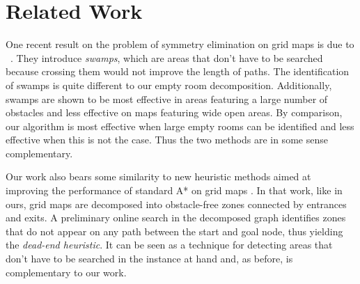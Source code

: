 \section{Related Work}
One recent result on the problem of symmetry elimination on grid maps is due to
\citeauthor{pochter10}~.
They introduce \emph{swamps}, which are areas that don't have to be searched
because crossing them would not improve the length of paths.
The identification of swamps is quite different to our empty room decomposition.
Additionally, swamps are shown to be most effective in areas featuring a large number of obstacles 
and less effective on maps featuring wide open areas.
By comparison, our algorithm is most effective when large empty rooms can be identified and less
effective when this is not the case.
Thus the two methods are in some sense complementary.
\par
Our work also bears some similarity to new heuristic methods aimed at improving the 
performance of standard A* on grid maps \cite{bjornsson06}.
In that work, like in ours, grid maps are decomposed into obstacle-free zones connected by entrances 
and exits.
A preliminary online search in the decomposed graph identifies zones that do not appear 
on any path between the start and goal node, thus yielding the \emph{dead-end heuristic}.
It can be seen as a technique for detecting areas that don't have to be searched
in the instance at hand and, as before, is complementary to our work.
